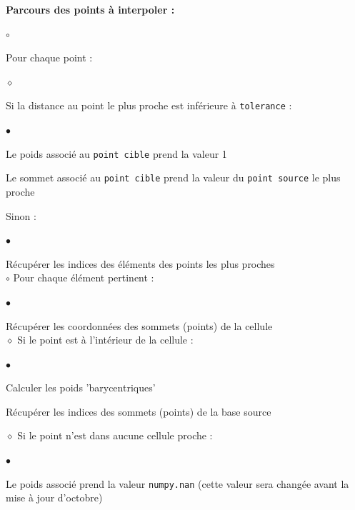 \vspace{0.5cm}

\textbf{Parcours des points à interpoler :}
\begin{list}{$\circ$}{\leftmargin=0.5cm  \itemsep=0cm}
    \item Pour chaque point :
    \begin{list}{$\diamond$}{\leftmargin=0.5cm  \itemsep=0cm}
        \item Si la distance au point le plus proche est inférieure à \texttt{tolerance} :
        \begin{list}{$\bullet$}{\leftmargin=0.5cm \itemsep=0cm}
            \item Le poids associé au \texttt{point cible} prend la valeur 1
            \item Le sommet associé au \texttt{point cible} prend la valeur du \texttt{point source} le plus proche
        \end{list}
        \item Sinon :
        \begin{list}{$\bullet$}{\leftmargin=0.5cm  \itemsep=0cm}
            \item Récupérer les indices des éléments des points les plus proches\\
            $\circ$ Pour chaque élément pertinent :
            \begin{list}{$\bullet$}{\leftmargin=0.5cm \itemsep=0cm}
                \item Récupérer les coordonnées des sommets (points) de la cellule\\
                $\diamond$ Si le point est à l'intérieur de la cellule :
                \begin{list}{$\bullet$}{\leftmargin=0.5cm  \itemsep=0cm}
                    \item Calculer les poids 'barycentriques'
                    \item Récupérer les indices des sommets (points) de la base source
                \end{list}
            \end{list}
        \end{list}
    \end{list}
    $\diamond$ Si le point n'est dans aucune cellule proche :
    \begin{list}{$\bullet$}{\leftmargin=0.5cm  \itemsep=0cm}
        \item Le poids associé prend la valeur \texttt{numpy.nan} (cette valeur sera changée avant la mise à jour d'octobre)
    \end{list}
\end{list}

